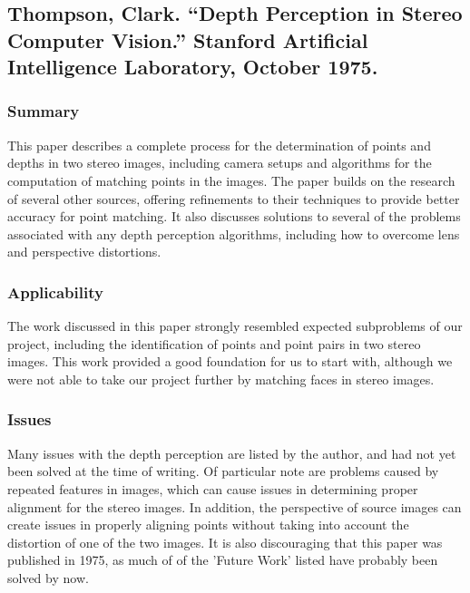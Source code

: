 \subsection{Thompson, Clark. ``Depth Perception in Stereo Computer Vision.'' Stanford Artificial Intelligence Laboratory, October 1975.}

\subsubsection{Summary}
This paper describes a complete process for the determination of points and depths in two stereo images, including camera setups and algorithms for the computation of matching points in the images. The paper builds on the research of several other sources, offering refinements to their techniques to provide better accuracy for point matching. It also discusses solutions to several of the problems associated with any depth perception algorithms, including how to overcome lens and perspective distortions.

\subsubsection{Applicability}
The work discussed in this paper strongly resembled expected subproblems of our project, including the identification of points and point pairs in two stereo images. This work provided a good foundation for us to start with, although we were not able to take our project further by matching faces in stereo images.

\subsubsection{Issues}
Many issues with the depth perception are listed by the author, and had not yet been solved at the time of writing. Of particular note are problems caused by repeated features in images, which can cause issues in determining proper alignment for the stereo images. In addition, the perspective of source images can create issues in properly aligning points without taking into account the distortion of one of the two images. It is also discouraging that this paper was published in 1975, as much of of the 'Future Work' listed have probably been solved by now.

